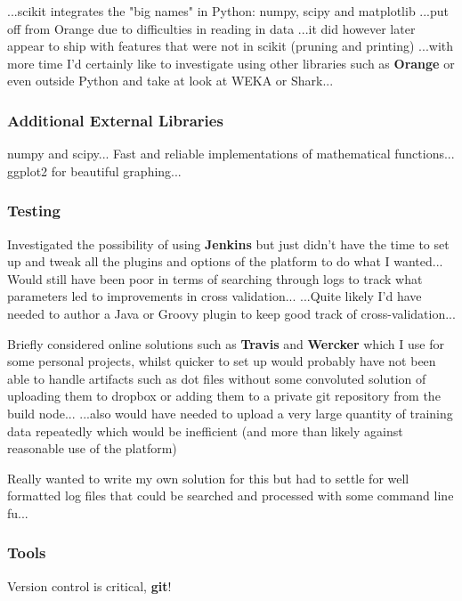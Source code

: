 ...scikit integrates the "big names" in Python: numpy, scipy and matplotlib
...put off from Orange due to difficulties in reading in data ...it did however
later appear to ship with features that were not in scikit (pruning and
printing) ...with more time I'd certainly like to investigate using other
libraries such as \textbf{Orange} or even outside Python and take at look at WEKA
or Shark...

\subsubsection{Additional External Libraries}
numpy\citep{numpyscipy} and scipy\citep{scipy}... Fast and reliable implementations of
mathematical functions...  ggplot2\citep{ggplot2} for beautiful graphing...

\subsubsection{Testing}
Investigated the possibility of using \textbf{Jenkins}
but just didn't have the time to set up and tweak all the plugins and options of
the platform to do what I wanted... Would still have been poor in terms of
searching through logs to track what parameters led to improvements in cross
validation... ...Quite likely I'd have needed to author a Java or Groovy plugin
to keep good track of cross-validation...

Briefly considered online solutions such as \textbf{Travis} and \textbf{Wercker}
which I use for some personal projects, whilst quicker to set up would probably
have not been able to handle artifacts such as dot files without some convoluted
solution of uploading them to dropbox or adding them to a private git repository
from the build node...  ...also would have needed to upload a very large
quantity of training data repeatedly which would be inefficient (and more than
likely against reasonable use of the platform)

Really wanted to write my own solution for this but had to settle for well
formatted log files that could be searched and processed with some command line
fu...

\subsubsection{Tools}
Version control is critical, \textbf{git}!


